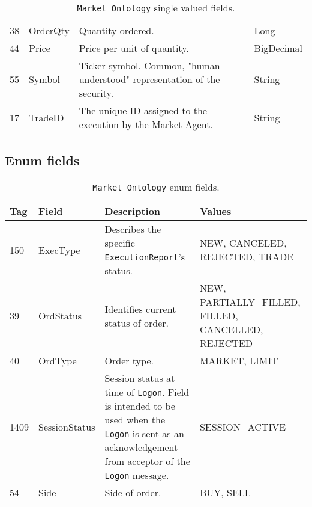 \begin{table}[htbp]
\begin{center}
\begin{tabular}{l l p{3.5in} l}
38  & OrderQty	& Quantity ordered.	& Long \\

44	& Price 	& Price per unit of quantity.	& BigDecimal  \\

55	& Symbol 	& Ticker symbol. Common, "human understood" representation of the security.	& String \\

17	& TradeID	& The unique ID assigned to the execution by the Market Agent. & String \\

\end{tabular}
\end{center}
\caption{\texttt{Market Ontology} single valued fields.}        
\end{table}

\pagebreak
\subsection{Enum fields}
\begin{table}[ht]
\begin{center}
\begin{tabular}{l l p{3in} p{1.5in}}

\multicolumn{1}{l}{\textbf{Tag}}            &
\multicolumn{1}{l}{\textbf{Field}}  	    &
\multicolumn{1}{l}{\textbf{Description}}    & 
\multicolumn{1}{l}{\textbf{Values}}			\\              
\toprule

150  & ExecType  & Describes the specific \texttt{ExecutionReport}'s status. & 
NEW, CANCELED, REJECTED, TRADE \\

39	 & OrdStatus & Identifies current status of order. & NEW, PARTIALLY\_FILLED, FILLED, CANCELLED, REJECTED \\

40	 & OrdType	& Order type.	& MARKET, LIMIT	\\

1409 & SessionStatus	& Session status at time of \texttt{Logon}. Field is intended to be used when the \texttt{Logon} is sent as an acknowledgement from acceptor of the \texttt{Logon} message.	& SESSION\_ACTIVE  \\

54	& Side		& Side of order.	& BUY, SELL \\
\end{tabular}
\end{center}
\caption{\texttt{Market Ontology} enum fields.}        
\end{table}

